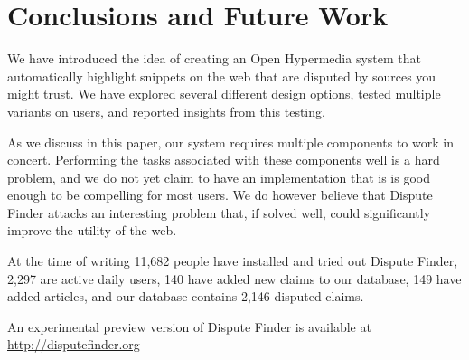 \documentclass{www2010-submission}
\newcommand{\todo}[1]{}
\begin{document}
\todo{Need to say that the argumentation graph contains all existing claims and that it was a simple ``supports"/``opposes'' graph.}

\todo{Come up with terminology for marking an evidence snippet, and agree on evidence vs source vs article}
\todo{Talk about how the early versions conflated evidence and snippets - and whether it makes sense to distinguish between them}
\todo{Screenshot of the claim graph interface}


\section{Conclusions and Future Work}

We have introduced the idea of creating an Open Hypermedia system that automatically highlight snippets on the web that are disputed by sources you might trust. We have explored several different design options, tested multiple variants on users, and reported insights from this testing.

As we discuss in this paper, our system requires multiple components to work in concert. Performing the tasks associated with these components well is a hard problem, and we do not yet claim to have an implementation that is is good enough to be compelling for most users. We do however believe that Dispute Finder attacks an interesting problem that, if solved well, could significantly improve the utility of the web.

At the time of writing 11,682 people have installed and tried out Dispute Finder, 2,297 are active daily users, 140 have added new claims to our database, 149 have added articles, and our database contains 2,146 disputed claims. 

An experimental preview version of Dispute Finder is available at 
\url{http://disputefinder.org}


\todo{Add count of disputed claims}


\todo{Do we want to have acknowledgements}


\todo{Sort out bad references}

\end{document}
